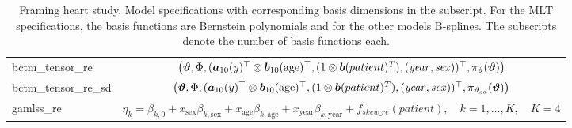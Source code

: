 \documentclass[12pt, a4paper]{article}
\begin{document}
\begin{table}[H]
\begin{tabular}{l|c}
        bctm\_tensor\_re & $\big( \text{\boldmath$\vartheta$},\Phi, ( \text{\boldmath$a$}_{10}(y)^\top \otimes  \text{\boldmath$b$}_{10}(\mathrm{age})^\top,(1 \otimes \text{\boldmath$b$}(patient)^T),  (\mathit{year}, \mathit{sex}))^\top,\allowbreak \pi_\vartheta(\text{\boldmath$\vartheta$})\big)$\\
        bctm\_tensor\_re\_sd & $\big( \text{\boldmath$\vartheta$},\Phi, ( \text{\boldmath$a$}_{10}(y)^\top \otimes  \text{\boldmath$b$}_{10}(\mathrm{age})^\top,(1 \otimes \text{\boldmath$b$}(patient)^T),  (\mathit{year}, \mathit{sex}))^\top,\allowbreak \pi_{\vartheta_{sd}}(\text{\boldmath$\vartheta$})\big)$\\
        gamlss\_re &  $\eta_k  = \beta_{k,0}  + x_{\text{sex}} \beta_{k,\text{sex}}  + x_{\text{age}} \beta_{k,\text{age}}  + x_{\text{year}} \beta_{k,\text{year}} + f_{skew\_re}(patient), \quad k=1,\ldots,K, \quad K=4$\\
        \hline\hline
    \end{tabular}
    \caption{Framing heart study. Model specifications with corresponding basis dimensions in the subscript. For the MLT specifications, the basis functions are Bernstein polynomials and for the other models B-splines. The subscripts denote the number of basis functions each.}
    \label{tab:FHS:models}
\end{table}
\end{document}
